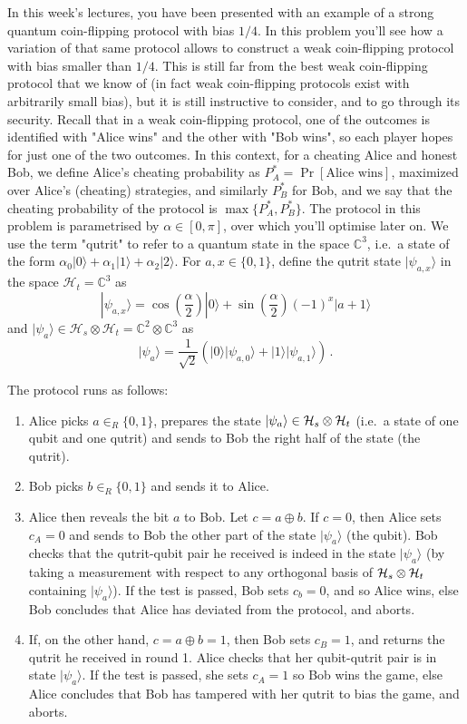 \documentclass[a4paper,10pt,landscape,twocolumn]{scrartcl}
\newcommand{\ket}[1]{| #1 \rangle}
\begin{document}
\begin{exercise} %
In this week's lectures, you have been presented with an example of a strong quantum coin-flipping protocol with bias $1/4$. In this problem you'll see how a variation of that same protocol allows to construct a weak coin-flipping protocol with bias smaller than $1/4$. This is still far from the best weak coin-flipping protocol that we know of (in fact weak coin-flipping protocols exist with arbitrarily small bias), but it is still instructive to consider, and to go through its security. 
Recall that in a weak coin-flipping protocol, one of the outcomes is identified with "Alice wins" and the other with "Bob wins", so each player hopes for just one of the two outcomes. In this context, for a cheating Alice and honest Bob, we define Alice's cheating probability as $P^*_A=\Pr[\text{Alice wins}]$, maximized over Alice's (cheating) strategies, and similarly $P_B^*$ for Bob, and we say that the cheating probability of the protocol is $\max\{P_A^*,P_B^*\}$. The protocol in this problem is parametrised by $\alpha \in [0,\pi]$, over which you'll optimise later on. 
We use the term "qutrit" to refer to a quantum state in the space $\mathbb{C}^3$, i.e.\ a state of the form $\alpha_0\ket{0}+\alpha_1\ket{1} + \alpha_2 \ket{2}$. For $a,x \in \{0,1\}$, define the qutrit state $\ket{\psi_{a,x}}$ in the space $\mathcal{H}_t = \mathbb{C}^3$ as
\[
\ket{\psi_{a,x}} = \cos(\frac{\alpha}{2}) \ket{0} + \sin(\frac{\alpha}{2}) (-1)^x \ket{a+1}
\]
and $\ket{\psi_a} \in \mathcal{H}_s \otimes \mathcal{H}_t = \mathbb{C}^2 \otimes \mathbb{C}^3$ as 
\[
\ket{\psi_a} = \frac{1}{\sqrt{2}} ( \ket{0} \ket{\psi_{a,0}} + \ket{1} \ket{\psi_{a,1}} ) \, .
\]

The protocol runs as follows:
\begin{enumerate}
\item Alice picks $a \in_R \{0,1\}$, prepares the state $\ket{\psi_a} \in \mathcal{H}_s \otimes \Hi_t$ (i.e.\ a state of one qubit and one qutrit) and sends to Bob the right half of the state (the qutrit).
\item Bob picks $b \in_R \{0,1\}$ and sends it to Alice.
\item Alice then reveals the bit $a$ to Bob. Let $c=a \oplus b$. If $c=0$, then Alice sets $c_A=0$ and sends to Bob the other part of the state $\ket{\psi_a}$ (the qubit). Bob checks that the qutrit-qubit pair he received is indeed in the state $\ket{\psi_a}$ (by taking a measurement with respect to any orthogonal basis of $\mathcal{H}_s \otimes \mathcal{H}_t$ containing $\ket{\psi_a}$). If the test is passed, Bob sets $c_b=0$, and so Alice wins, else Bob concludes that Alice has deviated from the protocol, and aborts.
\item If, on the other hand, $c=a \oplus b=1$, then Bob sets $c_B=1$, and returns the qutrit he received in round 1. Alice checks that her qubit-qutrit pair is in state $\ket{\psi_a}$. If the test is passed, she sets $c_A=1$ so Bob wins the game, else Alice concludes that Bob has tampered with her qutrit to bias the game, and aborts.
\end{enumerate}


\end{exercise}
\end{document}
